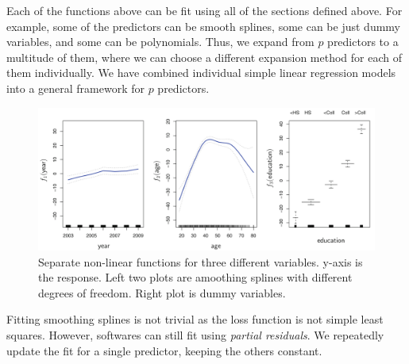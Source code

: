 \documentclass[11pt, a4paper]{article}
\begin{document}
    Each of the functions above can be fit using all of the sections defined above. For example, some of the predictors can be smooth splines, some can be just dummy variables, and some can be polynomials. Thus, we expand from $p$ predictors to a multitude of them, where we can choose a different expansion method for each of them individually. We have combined individual simple linear regression models into a general framework for $p$ predictors.

    \begin{figure}[h]
    \includegraphics[scale=0.6]{gam}
    \centering
    \caption{Separate non-linear functions for three different variables. y-axis is the response. Left two plots are amoothing splines with different degrees of freedom. Right plot is dummy variables.}
    \label{fig:gam} %
    \end{figure}

    Fitting smoothing splines is not trivial as the loss function is not simple least squares. However, softwares can still fit using \emph{partial residuals}. We repeatedly update the fit for a single predictor, keeping the others constant.
\end{document}
